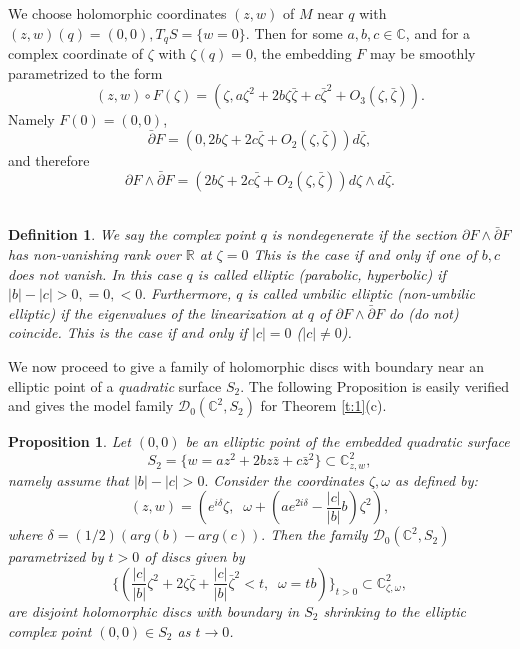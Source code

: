 \documentclass{amsart}
\newcommand{\be}{\begin{equation}}
\newcommand{\ee}{\end{equation}}
\newtheorem{proposition}[theorem]{Proposition}
\newtheorem{definition}[theorem]{Definition}
\begin{document}
 We choose holomorphic coordinates $(z,w)$ of $M$ near $q$ with $(z,w)(q)=(0,0), T_q  S=\{w=0\}$. Then for some $a,b,c \in {\mathbb{C}}$, and for a complex coordinate of  $\zeta$ with $\zeta(q) =0$, the embedding $F$ may be smoothly parametrized to the form 
\be \label{e:2} (z,w) \circ F(\zeta)=(\zeta, a \zeta^2 + 2b \zeta \bar\zeta + c \bar \zeta^2 + O_3(\zeta, \bar\zeta)).
\ee
Namely $F(0) = (0,0)$,
\[
\bar\partial F=(0, 2b\zeta + 2c\bar\zeta + O_2(\zeta,\bar\zeta))d \bar\zeta,
\]
and therefore
\[
\partial F \wedge \bar \partial F=(2b\zeta + 2c\bar\zeta + O_2(\zeta,\bar\zeta))d\zeta\wedge d\bar\zeta.
\]
 \\
\begin{definition}\cite{B}\label{d:4}
We say  the complex point $q$ is  {\em nondegenerate} if the section $\partial F \wedge \bar \partial F$ has non-vanishing rank over ${\mathbb{R}}$ at $\zeta =0$ This is the case if and only if one of $b, c$ does not vanish. 
In this case  $q$ is called {\em elliptic (parabolic, hyperbolic)} if  $|b|-|c| > 0,=0, < 0.$ Furthermore, $q$ is called {\em umbilic elliptic (non-umbilic elliptic)} if the eigenvalues of the linearization at $q$ of $\partial F \wedge \bar \partial F$ do (do not) coincide. This is the case if and only if $|c|=0$  ($|c|$$ \neq 0$). 
\end{definition} 

We now proceed to give a family of holomorphic discs with boundary near an elliptic point of a {\it quadratic} surface $S_2$. The following Proposition is easily verified and gives the model family  ${\mathcal D}_0({\mathbb{C}}^2,  S_2)$ for Theorem \ref{t:1}(c). 
\\
\begin{proposition}\label{p:4}
Let $(0,0)$ be an elliptic point of the embedded quadratic surface 
\begin{equation}\label{e:osc}
 S_2=\{ w=a z^2 + 2b z \bar z + c \bar{z}^2\} \subset {\mathbb{C}}^2_{z,w}, 
\end{equation}
namely assume that $|b|-|c| > 0.$ Consider the coordinates $\zeta, \omega$ as defined by: 
$$ (z,w)=\left(e^{i\delta}\zeta,\;\; \omega + (a e^{2i\delta}-{\textstyle{\frac{|c|}{|b|}}}b)\zeta^{2} \right),$$  
where $\delta=(1/2)(arg(b)-arg(c)). $ Then the family ${\mathcal D}_0({\mathbb{C}}^2,  S_2)$ parametrized by $t>0$ of discs given by 
\begin{equation}\label{e:fa}
    \{ \left({\textstyle{\frac{|c|}{|b|}}} \zeta^{2} + 2 \zeta \bar \zeta +{\textstyle{\frac{|c|}{|b|} }}\bar \zeta^{2} < t,\;\; \omega=tb\right)\}_{t>0} \subset {\mathbb{C}}^2_{\zeta ,\omega},
\end{equation}
are disjoint holomorphic discs with boundary in  $S_2$ shrinking to the elliptic complex point $(0,0) \in  S_2$ as $t\to 0$.
\end{proposition}
\end{document}
